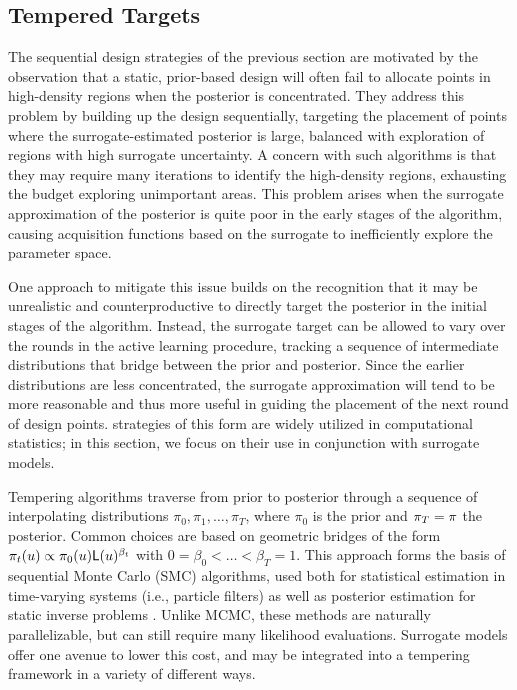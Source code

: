 \documentclass[12pt]{article}
\begin{document}
\subsection{Tempered Targets} \label{sec:tempering}
The sequential design strategies of the previous section are motivated by the observation
that a static, prior-based design will often fail to allocate points in high-density regions when the 
posterior is concentrated. They address this problem by building up the design sequentially,
targeting the placement of points where the surrogate-estimated posterior is large, balanced
with exploration of regions with high surrogate uncertainty. A concern with such algorithms is that 
they may require many iterations to identify the high-density regions, 
exhausting the budget exploring unimportant areas. This problem arises when the surrogate 
approximation of the posterior is quite poor in the early stages of the algorithm, causing 
acquisition functions based on the surrogate to inefficiently explore the parameter space.

One approach to mitigate this issue builds on the recognition that it may be unrealistic and 
counterproductive to directly target the posterior in the initial stages of the algorithm. 
Instead, the surrogate target can be allowed to vary over the rounds in the active 
learning procedure, tracking a sequence of intermediate distributions that bridge
between the prior and posterior. Since the earlier distributions are less concentrated, the surrogate 
approximation will tend to be more reasonable and thus more useful in guiding the placement of the 
next round of design points.  strategies of this form are widely utilized in 
computational statistics; in this section, we focus on their use in conjunction with surrogate models. 

Tempering algorithms traverse from prior to posterior through a sequence of interpolating
distributions $\pi_0, \pi_1, \dots, \pi_T$, where $\pi_0$ is the prior and $\pi_T = \pi$
the posterior. Common choices are based on geometric bridges of the form 
$\pi_t(u) \propto \pi_0(u) \mathsf{L}(u)^{\beta_t}$ with $0 = \beta_0 < \dots < \beta_T = 1$.
This approach forms the basis of sequential Monte Carlo (SMC) algorithms, used both for statistical 
estimation in time-varying systems (i.e., particle filters) as well as posterior estimation for 
static inverse problems . Unlike MCMC, these methods are naturally parallelizable,
but can still require many likelihood evaluations. Surrogate models offer one avenue to 
lower this cost, and may be integrated into a tempering framework in a variety of different 
ways. 
\end{document}
